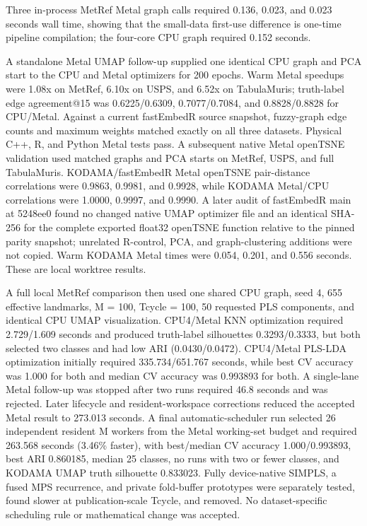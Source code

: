 \documentclass[twoside,11pt]{article}
\begin{document}
\begin{small}
Three in-process MetRef Metal graph calls required 0.136, 0.023, and 0.023 seconds wall time, showing that the small-data first-use difference is one-time pipeline compilation; the four-core CPU graph required 0.152 seconds.

A standalone Metal UMAP follow-up supplied one identical CPU graph and PCA start to the CPU and Metal optimizers for 200 epochs. Warm Metal speedups were 1.08x on MetRef, 6.10x on USPS, and 6.52x on TabulaMuris; truth-label edge agreement@15 was 0.6225/0.6309, 0.7077/0.7084, and 0.8828/0.8828 for CPU/Metal. Against a current fastEmbedR source snapshot, fuzzy-graph edge counts and maximum weights matched exactly on all three datasets. Physical C++, R, and Python Metal tests pass. A subsequent native Metal openTSNE validation used matched graphs and PCA starts on MetRef, USPS, and full TabulaMuris. KODAMA/fastEmbedR Metal openTSNE pair-distance correlations were 0.9863, 0.9981, and 0.9928, while KODAMA Metal/CPU correlations were 1.0000, 0.9997, and 0.9990. A later audit of fastEmbedR main at 5248ee0 found no changed native UMAP optimizer file and an identical SHA-256 for the complete exported float32 openTSNE function relative to the pinned parity snapshot; unrelated R-control, PCA, and graph-clustering additions were not copied. Warm KODAMA Metal times were 0.054, 0.201, and 0.556 seconds. These are local worktree results.

A full local MetRef comparison then used one shared CPU graph, seed 4, 655 effective landmarks, M = 100, Tcycle = 100, 50 requested PLS components, and identical CPU UMAP visualization. CPU4/Metal KNN optimization required 2.729/1.609 seconds and produced truth-label silhouettes 0.3293/0.3333, but both selected two classes and had low ARI (0.0430/0.0472). CPU4/Metal PLS-LDA optimization initially required 335.734/651.767 seconds, while best CV accuracy was 1.000 for both and median CV accuracy was 0.993893 for both. A single-lane Metal follow-up was stopped after two runs required 46.8 seconds and was rejected. Later lifecycle and resident-workspace corrections reduced the accepted Metal result to 273.013 seconds. A final automatic-scheduler run selected 26 independent resident M workers from the Metal working-set budget and required 263.568 seconds (3.46\% faster), with best/median CV accuracy 1.000/0.993893, best ARI 0.860185, median 25 classes, no runs with two or fewer classes, and KODAMA UMAP truth silhouette 0.833023. Fully device-native SIMPLS, a fused MPS recurrence, and private fold-buffer prototypes were separately tested, found slower at publication-scale Tcycle, and removed. No dataset-specific scheduling rule or mathematical change was accepted.


\end{small}
\end{document}
